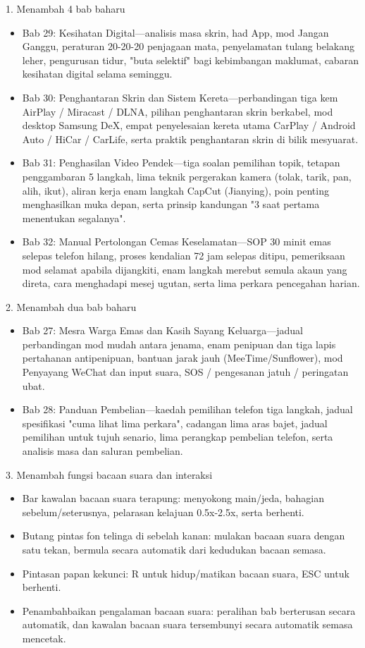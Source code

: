 
1. Menambah 4 bab baharu

\begin{itemize}
  \item Bab 29: Kesihatan Digital—analisis masa skrin, had App, mod Jangan Ganggu, peraturan 20-20-20 penjagaan mata, penyelamatan tulang belakang leher, pengurusan tidur, "buta selektif" bagi kebimbangan maklumat, cabaran kesihatan digital selama seminggu.
  \item Bab 30: Penghantaran Skrin dan Sistem Kereta—perbandingan tiga kem AirPlay / Miracast / DLNA, pilihan penghantaran skrin berkabel, mod desktop Samsung DeX, empat penyelesaian kereta utama CarPlay / Android Auto / HiCar / CarLife, serta praktik penghantaran skrin di bilik mesyuarat.
  \item Bab 31: Penghasilan Video Pendek—tiga soalan pemilihan topik, tetapan penggambaran 5 langkah, lima teknik pergerakan kamera (tolak, tarik, pan, alih, ikut), aliran kerja enam langkah CapCut (Jianying), poin penting menghasilkan muka depan, serta prinsip kandungan "3 saat pertama menentukan segalanya".
  \item Bab 32: Manual Pertolongan Cemas Keselamatan—SOP 30 minit emas selepas telefon hilang, proses kendalian 72 jam selepas ditipu, pemeriksaan mod selamat apabila dijangkiti, enam langkah merebut semula akaun yang direta, cara menghadapi mesej ugutan, serta lima perkara pencegahan harian.
\end{itemize}

2. Menambah dua bab baharu

\begin{itemize}
  \item Bab 27: Mesra Warga Emas dan Kasih Sayang Keluarga—jadual perbandingan mod mudah antara jenama, enam penipuan dan tiga lapis pertahanan antipenipuan, bantuan jarak jauh (MeeTime/Sunflower), mod Penyayang WeChat dan input suara, SOS / pengesanan jatuh / peringatan ubat.
  \item Bab 28: Panduan Pembelian—kaedah pemilihan telefon tiga langkah, jadual spesifikasi "cuma lihat lima perkara", cadangan lima aras bajet, jadual pemilihan untuk tujuh senario, lima perangkap pembelian telefon, serta analisis masa dan saluran pembelian.
\end{itemize}

3. Menambah fungsi bacaan suara dan interaksi

\begin{itemize}
  \item Bar kawalan bacaan suara terapung: menyokong main/jeda, bahagian sebelum/seterusnya, pelarasan kelajuan 0.5x-2.5x, serta berhenti.
  \item Butang pintas fon telinga di sebelah kanan: mulakan bacaan suara dengan satu tekan, bermula secara automatik dari kedudukan bacaan semasa.
  \item Pintasan papan kekunci: R untuk hidup/matikan bacaan suara, ESC untuk berhenti.
  \item Penambahbaikan pengalaman bacaan suara: peralihan bab berterusan secara automatik, dan kawalan bacaan suara tersembunyi secara automatik semasa mencetak.
\end{itemize}

